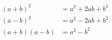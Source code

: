 \documentclass[11pt]{article}
\begin{document}
  \begin{subequations}
    \begin{align}
      (a+b)^2 &= a^2+2ab+b^2 \\
      (a-b)^2 &= a^2-2ab+b^2  \\
      (a+b)(a-b) &= a^2-b^2
    \end{align}
  \end{subequations}
\end{document}
